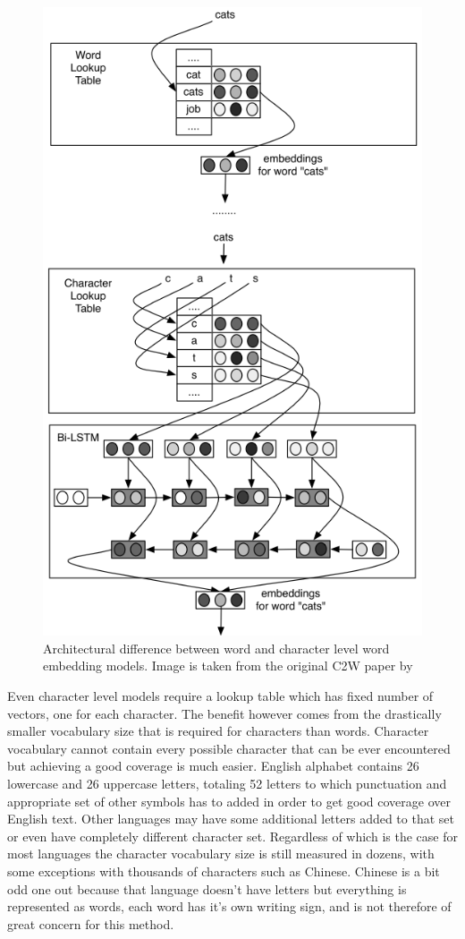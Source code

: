 \documentclass[12pt,a4paper,english
]{tutthesis}
\begin{document}
\begin{figure}[htbp]
\caption{Architectural difference between word and character level word embedding models. Image is taken from the original C2W paper by \cite{Ling2015}}
\label{figure:c2w}
\centering
\includegraphics[width=12cm]{c2w.png}
\end{figure}

Even character level models require a lookup table which has fixed number of vectors, one for each character. The benefit however comes from the drastically smaller vocabulary size that is required for characters than words. Character vocabulary cannot contain every possible character that can be ever encountered but achieving a good coverage is much easier. English alphabet contains 26 lowercase and 26 uppercase letters, totaling 52 letters to which punctuation and appropriate set of other symbols has to added in order to get good coverage over English text. Other languages may have some additional letters added to that set or even have completely different character set. Regardless of which is the case for most languages the character vocabulary size is still measured in dozens, with some exceptions with thousands of characters such as Chinese. Chinese is a bit odd one out because that language doesn't have letters but everything is represented as words, each word has it's own writing sign, and is not therefore of great concern for this method.
\end{document}
